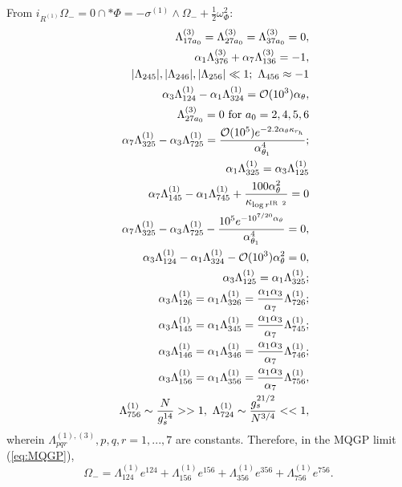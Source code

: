 \documentclass[a4paper,11pt,fleqn]{article}
\theoremstyle{plain}
\theoremstyle{definition}
\begin{document}
From $i_{R^{(1)}}\Omega_- = 0\cap *\Phi = - \sigma^{(1)}\wedge\Omega_- + \frac{1}{2}\omega_\Phi^2$:
\begin{eqnarray}
\label{Lambda-constraints}
& & \Lambda^{(3)}_{17a_0} = \Lambda^{(3)}_{27a_0}= \Lambda^{(3)}_{37a_0} = 0,\nonumber\\
& & \alpha_1\Lambda^{(3)}_{376} + \alpha_7\Lambda^{(3)}_{136} =  -1,\nonumber\\
& & |\Lambda_{245}|,   |\Lambda_{246}|,  |\Lambda_{256}| \ll 1;\  \Lambda_{456} \approx -1\nonumber\\
&  & \alpha_3 \Lambda^{(1)}_{124} - \alpha_1 \Lambda^{(1)}_{324} = {\cal O}(10^3)\alpha_\theta,\nonumber\\
& & \Lambda^{(3)}_{27a_0} = 0\ {\rm for}\ a_0 = 2, 4, 5, 6 \nonumber\\
&  & \alpha_7 \Lambda^{(1)}_{325} - \alpha_3 \Lambda^{(1)}_{725} = \frac{{\cal O}(10^5)e^{-2.2\alpha_\theta\kappa_{r_h}}}{\alpha_{\theta_1}^4};\nonumber\\
& & \alpha_1 \Lambda^{(1)}_{325} = \alpha_3 \Lambda^{(1)}_{125} \nonumber\\
& &  \alpha_7 \Lambda^{(1)}_{145} - \alpha_1 \Lambda^{(1)}_{745} + \frac{100\alpha_\theta^2}{\kappa_{\log r^{\rm IR}\ ^2}}  = 0\nonumber\\
& & \alpha_7 \Lambda^{(1)}_{325} - \alpha_3 \Lambda^{(1)}_{725} - \frac{10^5 e^{-10^{7/20} \alpha_\theta}}{\alpha_{\theta_1}^4} = 0,\nonumber\\
& & \alpha_3 \Lambda^{(1)}_{124} - \alpha_1 \Lambda^{(1)}_{324} -  {\cal O}(10^3) \alpha_\theta^2=0,\nonumber\\
& & \alpha_3 \Lambda^{(1)}_{125} = \alpha_1 \Lambda^{(1)}_{325};
\nonumber\\
& & \alpha_3 \Lambda^{(1)}_{126} = 
 \alpha_1 \Lambda^{(1)}_{326} = \frac{\alpha_1 \alpha_3}{\alpha_7} \Lambda^{(1)}_{726};\nonumber\\
& & \alpha_3 \Lambda^{(1)}_{145} = 
 \alpha_1 \Lambda^{(1)}_{345} = \frac{\alpha_1 \alpha_3}{\alpha_7} \Lambda^{(1)}_{745};
 \nonumber\\
& & \alpha_3 \Lambda^{(1)}_{146} = 
 \alpha_1 \Lambda^{(1)}_{346} = \frac{\alpha_1 \alpha_3}{\alpha_7} \Lambda^{(1)}_{746};\nonumber\\
& & \alpha_3 \Lambda^{(1)}_{156} = 
 \alpha_1 \Lambda^{(1)}_{356} = \frac{\alpha_1 \alpha_3}{\alpha_7} \Lambda^{(1)}_{756},\nonumber\\
& & \Lambda^{(1)}_{756}\sim\frac{N}{g_s^{14}}>>1,\ \Lambda^{(1)}_{724}\sim\frac{g_s^{21/2}}{N^{3/4}}<<1,
\end{eqnarray}
wherein $\Lambda^{(1),(3)}_{pqr}, p, q, r={1,...,7}$ are constants. 
Therefore, in the MQGP limit (\ref{eq:MQGP}),
\begin{equation}
\label{Omega-}
\Omega_- = \Lambda^{(1)}_{124}e^{124} + \Lambda^{(1)}_{156}e^{156} + \Lambda^{(1)}_{356} e^{356} + \Lambda^{(1)}_{756}e^{756}.
\end{equation}
\end{document}
